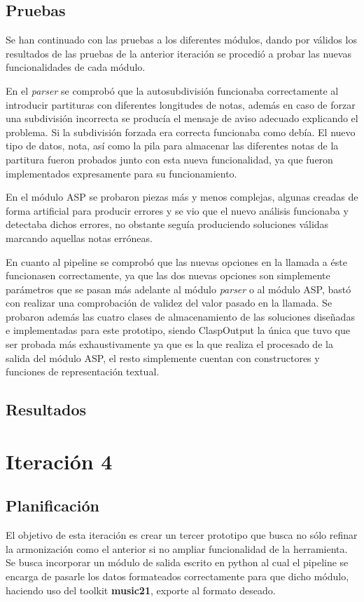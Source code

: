 \subsection{Pruebas}
Se han continuado con las pruebas a los diferentes módulos, dando por válidos los resultados de las pruebas de la anterior iteración se procedió a probar las nuevas funcionalidades de cada módulo.

En el \textit{parser} se comprobó que la autosubdivisión funcionaba correctamente al introducir partituras con diferentes longitudes de notas, además en caso de forzar una subdivisión incorrecta se producía el mensaje de aviso adecuado explicando el problema. Si la subdivisión forzada era correcta funcionaba como debía. El nuevo tipo de datos, nota, así como la pila para almacenar las diferentes notas de la partitura fueron probados junto con esta nueva funcionalidad, ya que fueron implementados expresamente para su funcionamiento.

En el módulo ASP se probaron piezas más y menos complejas, algunas creadas de forma artificial para producir errores y se vio que el nuevo análisis funcionaba y detectaba dichos errores, no obstante seguía produciendo soluciones válidas marcando aquellas notas erróneas.

En cuanto al pipeline se comprobó que las nuevas opciones en la llamada a éste funcionasen correctamente, ya que las dos nuevas opciones son simplemente parámetros que se pasan más adelante al módulo \textit{parser} o al módulo ASP, bastó con realizar una comprobación de validez del valor pasado en la llamada. Se probaron además las cuatro clases de almacenamiento de las soluciones diseñadas e implementadas para este prototipo, siendo ClaspOutput la única que tuvo que ser probada más exhaustivamente ya que es la que realiza el procesado de la salida del módulo ASP, el resto simplemente cuentan con constructores y funciones de representación textual. 

\subsection{Resultados}

\section{Iteración 4}

\subsection{Planificación}
El objetivo de esta iteración es crear un tercer prototipo que busca no sólo refinar la armonización como el anterior si no ampliar funcionalidad de la herramienta. Se busca incorporar un módulo de salida escrito en python al cual el pipeline se encarga de pasarle los datos formateados correctamente para que dicho módulo, haciendo uso del toolkit \textbf{music21}, exporte al formato deseado. 

